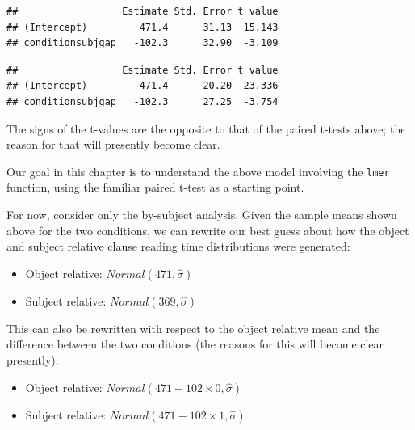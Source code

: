 \documentclass[12pt,]{krantz}
\newenvironment{Shaded}{\begin{snugshade}}{\end{snugshade}}
\newcommand{\DecValTok}[1]{\textcolor[rgb]{0.00,0.00,0.81}{#1}}
\newcommand{\KeywordTok}[1]{\textcolor[rgb]{0.13,0.29,0.53}{\textbf{#1}}}
\newcommand{\NormalTok}[1]{#1}
\newcommand{\OperatorTok}[1]{\textcolor[rgb]{0.81,0.36,0.00}{\textbf{#1}}}
\providecommand{\tightlist}{%
  \setlength{\itemsep}{0pt}\setlength{\parskip}{0pt}}
\begin{document}
\begin{verbatim}
##                  Estimate Std. Error t value
## (Intercept)         471.4      31.13  15.143
## conditionsubjgap   -102.3      32.90  -3.109
\end{verbatim}

\begin{Shaded}
\end{Shaded}

\begin{verbatim}
##                  Estimate Std. Error t value
## (Intercept)         471.4      20.20  23.336
## conditionsubjgap   -102.3      27.25  -3.754
\end{verbatim}

The signs of the t-values are the opposite to that of the paired t-tests above; the reason for that will presently become clear.

Our goal in this chapter is to understand the above model involving the \texttt{lmer} function, using the familiar paired t-test as a starting point.

For now, consider only the by-subject analysis.
Given the sample means shown above for the two conditions,
we can rewrite our best guess about how the object and subject relative clause reading time distributions were generated:

\begin{itemize}
\tightlist
\item
  Object relative: \(Normal(471,\hat\sigma)\)
\item
  Subject relative: \(Normal(369,\hat\sigma)\)
\end{itemize}

This can also be rewritten with respect to the object relative mean and the difference between the two conditions (the reasons for this will become clear presently):

\begin{itemize}
\tightlist
\item
  Object relative: \(Normal(471-102\times 0,\hat\sigma)\)
\item
  Subject relative: \(Normal(471-102\times 1,\hat\sigma)\)
\end{itemize}
\end{document}
